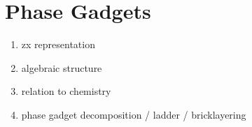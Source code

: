 \section{Phase Gadgets}
\begin{enumerate}
    \item zx representation
    \item algebraic structure
    \item relation to chemistry
    \item phase gadget decomposition / ladder / bricklayering
\end{enumerate}
